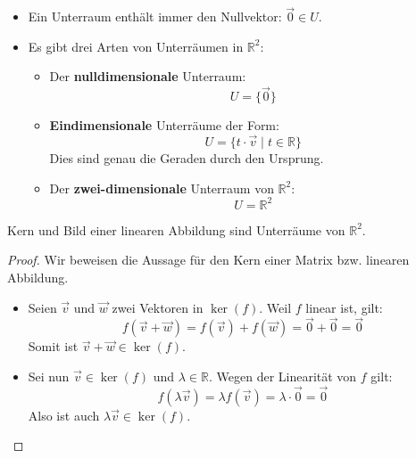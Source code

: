 \begin{itemize}
  \item Ein Unterraum enthält immer den Nullvektor: \( \vec{0} \in U \).
  
  \item Es gibt drei Arten von Unterräumen in \( \mathbb{R}^2 \):
  \begin{itemize}
    \item Der \textbf{nulldimensionale} Unterraum:  
    \[
    U = \{ \vec{0} \}
    \]
    
    \item \textbf{Eindimensionale} Unterräume der Form:
    \[
    U = \{ t \cdot \vec{v} \mid t \in \mathbb{R} \}
    \]
    Dies sind genau die Geraden durch den Ursprung.

    \item Der \textbf{zwei-dimensionale} Unterraum von \( \mathbb{R}^2 \):
    \[
    U = \mathbb{R}^2
    \]
  \end{itemize}
\end{itemize}
\begin{satz}
    {}{}
    Kern und Bild einer linearen Abbildung sind Unterräume von \( \mathbb{R}^2 \).
\end{satz}
\begin{proof}
    
Wir beweisen die Aussage für den Kern einer Matrix bzw. linearen Abbildung.

\begin{itemize}
    \item Seien \( \vec{v} \) und \( \vec{w} \) zwei Vektoren in \( \ker(f) \).  
Weil \( f \) linear ist, gilt:
\[
f(\vec{v} + \vec{w}) = f(\vec{v}) + f(\vec{w}) = \vec{0} + \vec{0} = \vec{0}
\]
Somit ist \( \vec{v} + \vec{w} \in \ker(f) \).

\item Sei nun \( \vec{v} \in \ker(f) \) und \( \lambda \in \mathbb{R} \).  
Wegen der Linearität von \( f \) gilt:
\[
f(\lambda \vec{v}) = \lambda f(\vec{v}) = \lambda \cdot \vec{0} = \vec{0}
\]
Also ist auch \( \lambda \vec{v} \in \ker(f) \).
\end{itemize}


\end{proof}


